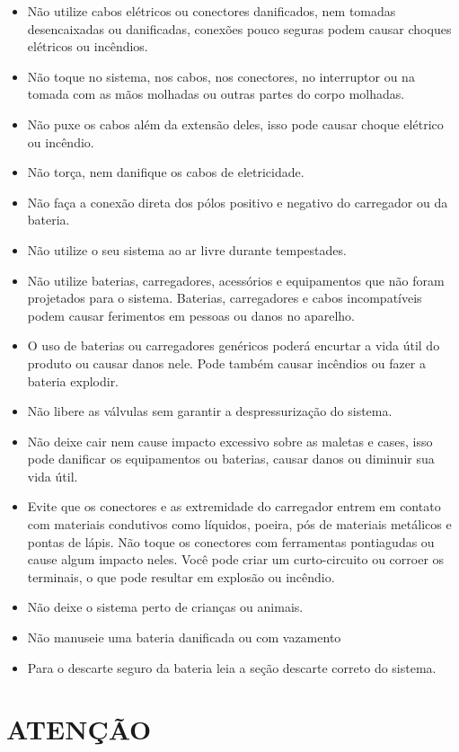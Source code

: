 \begin{itemize}
    \item Não utilize cabos elétricos ou conectores danificados, nem tomadas desencaixadas ou danificadas, conexões pouco seguras podem causar choques elétricos ou incêndios.
    \item Não toque no sistema, nos cabos, nos conectores, no interruptor ou na tomada com as mãos molhadas ou outras partes do corpo molhadas.
    \item Não puxe os cabos além da extensão deles, isso pode causar choque elétrico ou incêndio.
    \item Não torça, nem danifique os cabos de eletricidade.
    \item Não faça a conexão direta dos pólos positivo e negativo do carregador ou da bateria.
    \item Não utilize o seu sistema ao ar livre durante tempestades.
    \item Não utilize baterias, carregadores, acessórios e equipamentos que não foram projetados para o sistema. Baterias, carregadores e cabos incompatíveis podem causar ferimentos em pessoas ou danos no aparelho.
    \item O uso de baterias ou carregadores genéricos poderá encurtar a vida útil do produto ou causar danos nele. Pode também causar incêndios ou fazer a bateria explodir.
    \item Não libere as válvulas sem garantir a despressurização do sistema.
    \item Não deixe cair nem cause impacto excessivo sobre as maletas e cases, isso pode danificar os equipamentos ou baterias, causar danos ou diminuir sua vida útil.
    \item Evite que os conectores e as extremidade do carregador entrem em contato com materiais condutivos como líquidos, poeira, pós de materiais metálicos e pontas de lápis. Não toque os conectores com ferramentas pontiagudas ou cause algum impacto neles. Você pode criar um curto-circuito ou corroer os terminais, o que pode resultar em explosão ou incêndio.
    \item Não deixe o sistema perto de crianças ou animais.
    \item Não manuseie uma bateria  danificada ou com vazamento
    \item Para o descarte seguro da bateria leia a seção descarte correto do sistema.
\end{itemize}

\section*{ATENÇÃO}

